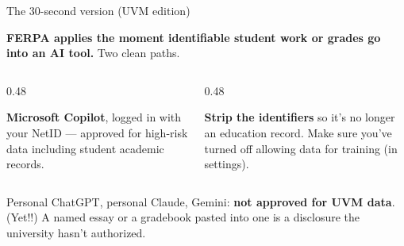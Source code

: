 \documentclass[aspectratio=169, 10pt]{beamer}
\newcommand{\cmcite}[1]{{\scriptsize\color{CoolGray}\textit{#1}}}
\begin{document}
\begin{frame}{The 30-second version (UVM edition)}
\vskip-8pt
\begin{tcolorbox}[accentbox, top=1pt, bottom=1pt]
\footnotesize
\textbf{FERPA applies the moment identifiable student work or grades go into an AI tool.} Two clean paths.
\end{tcolorbox}
\vskip2pt
\begin{columns}[T]
\begin{column}{0.48\textwidth}
\begin{tcolorbox}[dobox, title={\faCheck\quad Path 1: UVM-approved tool}, top=1pt, bottom=1pt]
\footnotesize
\textbf{Microsoft Copilot}, logged in with your NetID --- approved for high-risk data including student academic records.
\vskip2pt
\end{tcolorbox}
\end{column}
\begin{column}{0.48\textwidth}
\begin{tcolorbox}[dobox, title={\faCheck\quad Path 2: De-identify first}, top=1pt, bottom=1pt]
\footnotesize \textbf{Strip the identifiers} so it's no longer an education record. Make sure you've turned off allowing data for training (in settings).
\end{tcolorbox}
\end{column}
\end{columns}
\vskip2pt
\begin{tcolorbox}[dontbox, title={\faBan\quad Not this path}, top=1pt, bottom=1pt]
\footnotesize Personal ChatGPT, personal Claude, Gemini: \textbf{not approved for UVM data}. (Yet!!) A named essay or a gradebook pasted into one is a disclosure the university hasn't authorized.
\end{tcolorbox}
\vskip-1pt
\end{frame}
\end{document}
